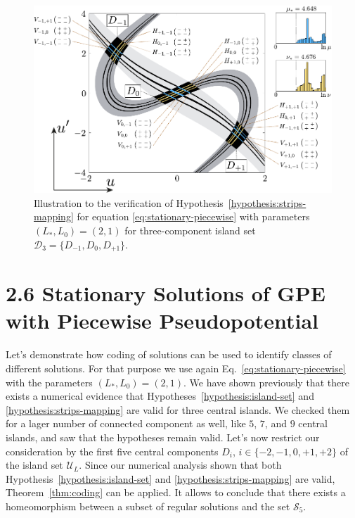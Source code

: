 \begin{figure}[h]
\centering
	\includegraphics[scale = 1]{pic/hypotheses for piecewise equation}
	\caption{
		Illustration to the verification of Hypothesis~\ref{hypothesis:strips-mapping} for equation \eqref{eq:stationary-piecewise} with parameters $(L_*, L_0) = (2, 1)$ for three-component island set $\mathcal{D}_3 = \{ D_{-1}, D_0, D_{+1} \}$.
	}
\label{fig:hypotheses-validation-piecewise}
\end{figure}

\section*{2.6 Stationary Solutions of GPE with Piecewise Pseudopotential}

Let's demonstrate how coding of solutions can be used to identify classes of different solutions.
For that purpose we use again Eq.~\eqref{eq:stationary-piecewise} with the parameters $(L_*, L_0) = (2, 1)$.
We have shown previously that there exists a numerical evidence that Hypotheses~\ref{hypothesis:island-set} and \ref{hypothesis:strips-mapping} are valid for three central islands.
We checked them for a lager number of connected component as well, like $5$, $7$, and $9$ central islands, and saw that the hypotheses remain valid.
Let's now restrict our consideration by the first five central components $D_i$, $i \in \{ -2, -1, 0, +1, +2 \}$ of the island set $\mathscr{U}_L$.
Since our numerical analysis shown that both Hypothesis~\ref{hypothesis:island-set} and \ref{hypothesis:strips-mapping} are valid, Theorem~\ref{thm:coding} can be applied.
It allows to conclude that there exists a homeomorphism between a subset of regular solutions and the set $\mathcal{S}_5$.


